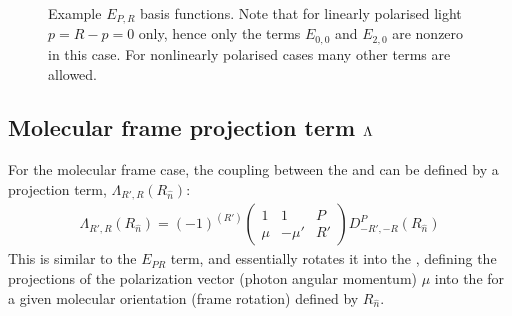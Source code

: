 \documentclass[letterpaper,table,10pt,english]{jupyterBook}
\begin{document}
\begin{figure}[htbp]
\centering
\capstart

\noindent{}
\caption{Example \(E_{P,R}\) basis functions. Note that for linearly polarised light \(p=R-p=0\) only, hence only the terms \(E_{0,0}\) and \(E_{2,0}\) are non\sphinxhyphen{}zero in this case. For non\sphinxhyphen{}linearly polarised cases many other terms are allowed.}\label{\detokenize{part1/theory_tensor_formalism_201122:fig-epr-basis}}\end{figure}


\subsection{Molecular frame projection term \protect\(\Lambda\protect\)}
\label{\detokenize{part1/theory_tensor_formalism_201122:molecular-frame-projection-term-lambda}}\label{\detokenize{part1/theory_tensor_formalism_201122:sec-theory-lambda-term}}
\sphinxAtStartPar
For the molecular frame case, the coupling between the {\hyperref[\detokenize{backmatter/glossary:term-LF}]{}} and {\hyperref[\detokenize{backmatter/glossary:term-MF}]{}} can be defined by a projection term, \(\Lambda_{R',R}(R_{\hat{n}})\):
\begin{equation}\label{equation:part1/theory_tensor_formalism_201122:eq:basis-lambda-MF-defn}
\begin{split}
\Lambda_{R',R}(R_{\hat{n}})=(-1)^{(R')}\left(\begin{array}{ccc}
1 & 1 & P\\
\mu & -\mu' & R'
\end{array}\right)D_{-R',-R}^{P}(R_{\hat{n}})
\end{split}
\end{equation}
\sphinxAtStartPar
This is similar to the \(E_{PR}\) term, and essentially rotates it into the {\hyperref[\detokenize{backmatter/glossary:term-MF}]{}}, defining the projections of the polarization vector (photon angular momentum) \(\mu\) into the {\hyperref[\detokenize{backmatter/glossary:term-MF}]{}} for a given molecular orientation (frame rotation) defined by \(R_{\hat{n}}\).
\end{document}
